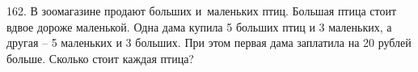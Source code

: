 162. В зоомагазине продают больших и маленьких птиц. Большая птица стоит вдвое дороже маленькой. Одна дама купила 5 больших птиц и 3 маленьких, а другая – 5 маленьких и 3 больших. При этом первая дама заплатила на 20 рублей больше. Сколько стоит каждая птица?\\
